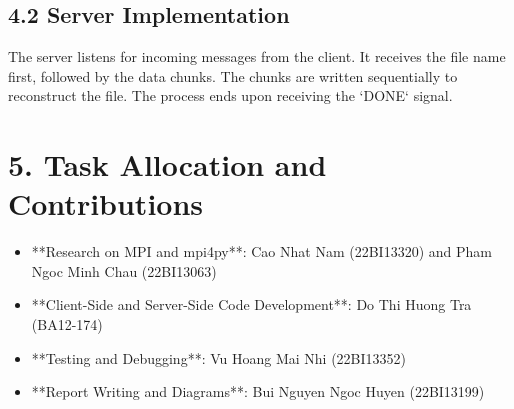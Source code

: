 \documentclass[a4paper,12pt]{article}
\begin{document}
\subsection*{4.2 Server Implementation}
The server listens for incoming messages from the client. It receives the file name first, followed by the data chunks. The chunks are written sequentially to reconstruct the file. The process ends upon receiving the `DONE` signal.

\section*{5. Task Allocation and Contributions}
\begin{itemize}
    \item **Research on MPI and mpi4py**: Cao Nhat Nam (22BI13320) and Pham Ngoc Minh Chau (22BI13063)
    \item **Client-Side and Server-Side Code Development**: Do Thi Huong Tra (BA12-174)
    \item **Testing and Debugging**: Vu Hoang Mai Nhi (22BI13352)
    \item **Report Writing and Diagrams**: Bui Nguyen Ngoc Huyen (22BI13199)
\end{itemize}
\end{document}
